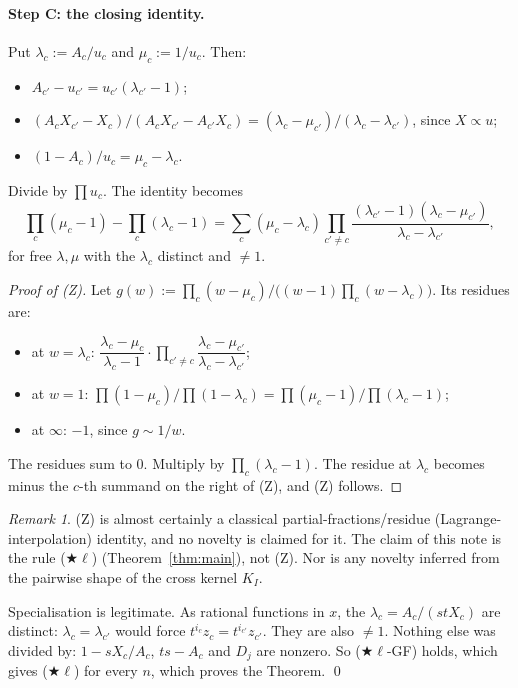 \documentclass[11pt]{amsart}
\theoremstyle{remark}
\newtheorem*{remark}{Remark}
\newcommand{\starl}{($\bigstar\ell$)}
\begin{document}
\paragraph{Step C: the closing identity.} Put $\lambda_c:=A_c/u_c$ and $\mu_c:=1/u_c$. Then:
\begin{itemize}
\item $A_{c'}-u_{c'}=u_{c'}(\lambda_{c'}-1)$;
\item $(A_cX_{c'}-X_c)/(A_cX_{c'}-A_{c'}X_c)=(\lambda_c-\mu_{c'})/(\lambda_c-\lambda_{c'})$, since $X\propto u$;
\item $(1-A_c)/u_c=\mu_c-\lambda_c$.
\end{itemize}
Divide by $\prod u_c$. The identity becomes
\[
\prod_c(\mu_c-1)-\prod_c(\lambda_c-1)=\sum_c(\mu_c-\lambda_c)\prod_{c'\ne c}\frac{(\lambda_{c'}-1)(\lambda_c-\mu_{c'})}{\lambda_c-\lambda_{c'}},\tag{Z}
\]
for free $\lambda,\mu$ with the $\lambda_c$ distinct and $\ne1$.

\begin{proof}[Proof of (Z)]
Let $g(w):=\prod_c(w-\mu_c)\big/\bigl((w-1)\prod_c(w-\lambda_c)\bigr)$. Its residues are:
\begin{itemize}
\item at $w=\lambda_c$: $\dfrac{\lambda_c-\mu_c}{\lambda_c-1}\cdot\prod_{c'\ne c}\dfrac{\lambda_c-\mu_{c'}}{\lambda_c-\lambda_{c'}}$;
\item at $w=1$: $\prod(1-\mu_c)/\prod(1-\lambda_c)=\prod(\mu_c-1)/\prod(\lambda_c-1)$;
\item at $\infty$: $-1$, since $g\sim1/w$.
\end{itemize}
The residues sum to $0$. Multiply by $\prod_c(\lambda_c-1)$. The residue at $\lambda_c$ becomes minus the $c$-th summand on the right of (Z), and (Z) follows.
\end{proof}

\begin{remark}
(Z) is almost certainly a classical partial-fractions/residue (Lagrange-interpolation) identity, and no novelty is claimed for it. The claim of this note is the rule \starl{} (Theorem~\ref{thm:main}), not (Z). Nor is any novelty inferred from the pairwise shape of the cross kernel $K_I$.
\end{remark}

Specialisation is legitimate. As rational functions in $x$, the $\lambda_c=A_c/(stX_c)$ are distinct: $\lambda_c=\lambda_{c'}$ would force $t^{i_c}z_c=t^{i_{c'}}z_{c'}$. They are also $\ne1$. Nothing else was divided by: $1-sX_c/A_c$, $ts-A_c$ and $D_j$ are nonzero. So ($\bigstar\ell$-GF) holds, which gives \starl{} for every $n$, which proves the Theorem. \qed
\end{document}
